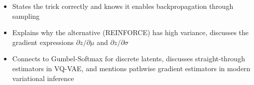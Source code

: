 \begin{interviewq}

\goodgreat
\begin{itemize}
    \item {} States the trick correctly and knows it enables backpropagation through sampling
    \item {} Explains why the alternative (REINFORCE) has high variance, discusses the gradient expressions $\partial z/\partial \mu$ and $\partial z/\partial \sigma$
    \item {} Connects to Gumbel-Softmax for discrete latents, discusses straight-through estimators in VQ-VAE, and mentions pathwise gradient estimators in modern variational inference
\end{itemize}

\end{interviewq}

